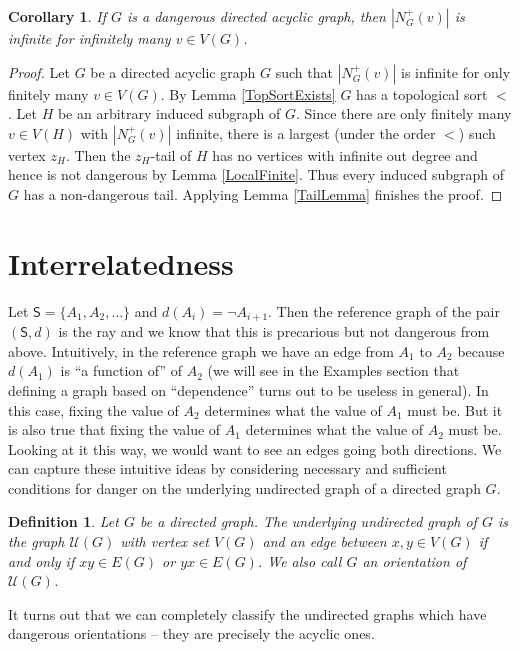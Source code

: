 \documentclass[12pt]{article}
\newtheorem{cor}[thm]{Corollary}
\newtheorem{defn}{Definition}
\theoremstyle{remark}
\newcommand{\fancy}[1]{\mathcal{#1}}
\def\S{\textsf{S}}
\def\U{\fancy{U}}
\begin{document}
\begin{cor}\label{InfinitelyManyInfinite}
If $G$ is a dangerous directed acyclic graph, then $|N^{+}_G(v)|$ is infinite for infinitely many $v \in V(G)$.
\end{cor}
\begin{proof}
Let $G$ be a directed acyclic graph $G$ such that $|N^{+}_G(v)|$ is infinite for only finitely many $v \in V(G)$.  By Lemma \ref{TopSortExists} $G$ has a topological sort $<$.  Let $H$ be an arbitrary induced subgraph of $G$. Since there are only finitely many $v \in V(H)$ with $|N^{+}_G(v)|$ infinite, there is a largest (under the order $<$) such vertex $z_H$.  Then the $z_H$-tail of $H$ has no vertices with infinite out degree and hence is not dangerous by Lemma \ref{LocalFinite}.  Thus every induced subgraph of $G$ has a non-dangerous tail.  Applying Lemma \ref{TailLemma} finishes the proof.
\end{proof}

\section{Interrelatedness}
Let $\S = \{A_1, A_2, \ldots\}$ and $d(A_i) = \neg A_{i+1}$.  Then the reference graph of the pair $(\S, d)$ is the ray and we know that this is precarious but not dangerous from above.  Intuitively, in the reference graph we have an edge from $A_1$ to $A_2$ because $d(A_1)$ is ``a function of'' of $A_2$ (we will see in the Examples section that defining a graph based on ``dependence'' turns out to be useless in general). In this case, fixing the value of $A_2$ determines what the value of $A_1$ must be.  But it is also true that fixing the value of $A_1$ determines what the value of $A_2$ must be.  Looking at it this way, we would want to see an edges going both directions.  We can capture these intuitive ideas by considering necessary and sufficient conditions for danger on the underlying undirected graph of a directed graph $G$.

\begin{defn}
Let $G$ be a directed graph.  The \emph{underlying undirected graph} of $G$ is the graph $\U(G)$ with vertex set $V(G)$ and an edge between $x, y \in V(G)$ if and only if $xy \in E(G)$ or $yx \in E(G)$.  We also call $G$ an \emph{orientation} of $\U(G)$.
\end{defn}

It turns out that we can completely classify the undirected graphs which have dangerous orientations -- they are precisely the acyclic ones.  
\end{document}
